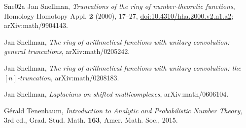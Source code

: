 \documentclass[a4paper,11pt,oneside,reqno]{amsart}
\theoremstyle{definition}
\theoremstyle{remark}
\theoremstyle{plain}
\begin{document}
\begin{thebibliography}{Sne02a}
Jan Snellman,
\emph{Truncations of the ring of number-theoretic functions},
Homology Homotopy Appl. \textbf{2} (2000), 17--27,
\href{https://doi.org/10.4310/hha.2000.v2.n1.a2}{doi:10.4310/hha.2000.v2.n1.a2};
arXiv:math/9904143.

Jan Snellman,
\emph{The ring of arithmetical functions with unitary convolution: general
truncations},
arXiv:math/0205242.

Jan Snellman,
\emph{The ring of arithmetical functions with unitary convolution: the
\([n]\)-truncation},
arXiv:math/0208183.

Jan Snellman,
\emph{Laplacians on shifted multicomplexes},
arXiv:math/0606104.

Gérald Tenenbaum,
\emph{Introduction to Analytic and Probabilistic Number Theory},
3rd ed., Grad. Stud. Math. \textbf{163}, Amer. Math. Soc., 2015.

\end{thebibliography}
\end{document}
